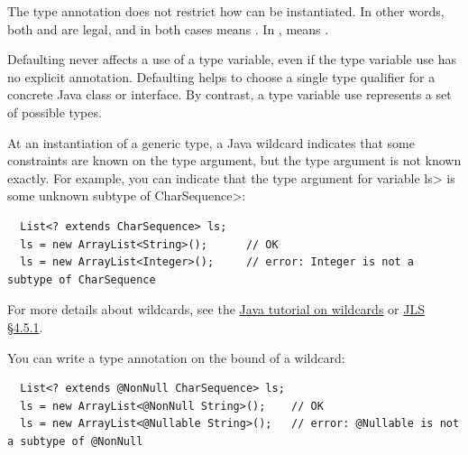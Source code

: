\noindent
The type annotation does not restrict how  can be
instantiated.  In other words, both
 and  are
legal, and in both cases  means .
In ,
 means .





Defaulting never affects a use of a type variable, even if the type
variable use has no explicit annotation.  Defaulting helps to choose a
single type qualifier for a concrete Java class or interface.  By contrast,
a type variable use represents a set of possible types.



At an instantiation of a generic type, a Java wildcard indicates that some
constraints are known on the type argument, but the type argument is not known
exactly.
For example, you can indicate that the type argument for variable \<ls> is
some unknown subtype of \<CharSequence>:

\begin{Verbatim}
  List<? extends CharSequence> ls;
  ls = new ArrayList<String>();      // OK
  ls = new ArrayList<Integer>();     // error: Integer is not a subtype of CharSequence
\end{Verbatim}

For more details about wildcards, see the
\href{https://docs.oracle.com/javase/tutorial/java/generics/wildcards.html}{Java
  tutorial on wildcards} or
\href{https://docs.oracle.com/javase/specs/jls/se25/html/jls-4.html#jls-4.5.1}{JLS
  \S 4.5.1}.

You can write a type annotation on the bound of a wildcard:

\begin{Verbatim}
  List<? extends @NonNull CharSequence> ls;
  ls = new ArrayList<@NonNull String>();    // OK
  ls = new ArrayList<@Nullable String>();   // error: @Nullable is not a subtype of @NonNull
\end{Verbatim}

